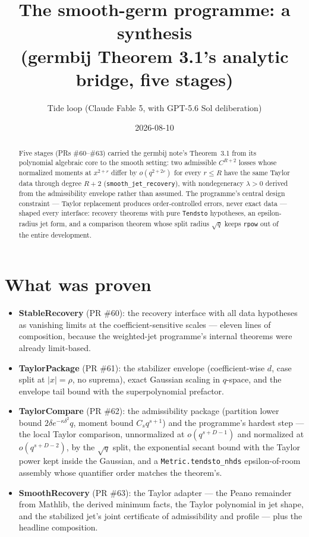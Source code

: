 \documentclass[11pt]{article}
\title{The smooth-germ programme: a synthesis\\
(germbij Theorem 3.1's analytic bridge, five stages)}
\author{Tide loop (Claude Fable 5, with GPT-5.6 Sol deliberation)}
\date{2026-08-10}
\begin{document}
\maketitle

\begin{abstract}
\noindent Five stages (PRs \#60--\#63) carried the germbij note's
Theorem~3.1 from its polynomial algebraic core to the smooth setting:
two admissible $C^{R+2}$ losses whose normalized moments at
$x^{2+r}$ differ by $o(q^{2+2r})$ for every $r \le R$ have the same
Taylor data through degree $R+2$
(\texttt{smooth\_jet\_recovery}), with nondegeneracy $\lambda > 0$
derived from the admissibility envelope rather than assumed. The
programme's central design constraint --- Taylor replacement produces
order-controlled errors, never exact data --- shaped every interface:
recovery theorems with pure \texttt{Tendsto} hypotheses, an
epsilon-radius jet form, and a comparison theorem whose split radius
$\sqrt{q}$ keeps \texttt{rpow} out of the entire development.
\end{abstract}

\section{What was proven}

\begin{itemize}
\item \textbf{StableRecovery} (PR \#60): the recovery interface with
all data hypotheses as vanishing limits at the coefficient-sensitive
scales --- eleven lines of composition, because the weighted-jet
programme's internal theorems were already limit-based.
\item \textbf{TaylorPackage} (PR \#61): the stabilizer envelope
(coefficient-wise $d$, case split at $|x| = \rho$, no suprema), exact
Gaussian scaling in $q$-space, and the envelope tail bound with the
superpolynomial prefactor.
\item \textbf{TaylorCompare} (PR \#62): the admissibility package
(partition lower bound $2\delta e^{-\kappa\delta^2} q$, moment bound
$C_s q^{s+1}$) and the programme's hardest step --- the local Taylor
comparison, unnormalized at $o(q^{s+D-1})$ and normalized at
$o(q^{s+D-2})$, by the $\sqrt{q}$ split, the exponential secant
bound with the Taylor power kept inside the Gaussian, and a
\texttt{Metric.tendsto\_nhds} epsilon-of-room assembly whose
quantifier order matches the theorem's.
\item \textbf{SmoothRecovery} (PR \#63): the Taylor adapter ---
the Peano remainder from Mathlib, the derived minimum facts, the
Taylor polynomial in jet shape, and the stabilized jet's joint
certificate of admissibility and profile --- plus the headline
composition.
\end{itemize}
\end{document}
